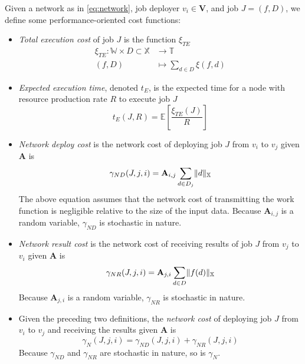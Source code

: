 \documentclass[../mthe-493-project-proposal.tex]{subfiles}
\begin{document}
    Given a network as in \eqref{eq:network}, job deployer $v_i \in \mathbf{V}$, and job $J = (f, D)$, we define some performance-oriented cost functions:
    \begin{itemize}
        \item \textit{Total execution cost} of job $J$ is the function $\xi_{TE}$
              \begin{align}
                  \xi_{TE} \colon \mathbb{W} \times D \subset \mathbb{X} &\to \mathbb{T} \label{eq:total-execution-cost} \\
                  (f, D)                                                 &\mapsto \sum\limits_{d \in D} \xi(f, d) \nonumber
              \end{align}
              
        \item \textit{Expected execution time}, denoted $t_E$, is the expected time for a node with resource production rate $R$ to execute job $J$
                \begin{equation}
                \label{eq:expected-execution-time}
                    t_E(J, R) = \mathbb{E}\left[ \frac{\xi_{TE}(J)}{R} \right]
                \end{equation}

        \item \textit{Network deploy cost} is the network cost of deploying job $J$ from $v_i$ to $v_j$ given $\mathbf{A}$ is
              \begin{equation}
              \label{eq:network-deploy-cost}
                  \gamma_{ND}(J, j, i) = \mathbf{A}_{i,j} \sum\limits_{d \in D_j} \lVert d\rVert_{\mathbb{X}}
              \end{equation}
              The above equation assumes that the network cost of transmitting the work function is negligible relative to the size of the input data. Because $\mathbf{A}_{i,j}$ is a random variable, $\gamma_{ND}$ is stochastic in nature.

        \item \textit{Network result cost} is the network cost of receiving results of job $J$ from $v_j$ to $v_i$ given $\mathbf{A}$ is
              \begin{equation}
              \label{eq:network-result-cost}
                  \gamma_{NR}(J, j, i) = \mathbf{A}_{j, i} \sum\limits_{d \in D} \lVert f(d)\rVert_{\mathbb{X}}
              \end{equation}
              Because $\mathbf{A}_{j,i}$ is a random variable, $\gamma_{NR}$ is stochastic in nature.

        \item Given the preceding two definitions, the \textit{network cost} of deploying job $J$ from $v_i$ to $v_j$ and receiving the results  given $\mathbf{A}$ is
              \begin{equation}
              \label{eq:network-cost}
                  \gamma_N(J, j, i) = \gamma_{ND}(J, j, i) + \gamma_{NR}(J, j, i)
              \end{equation}
              Because $\gamma_{ND}$ and $\gamma_{NR}$ are stochastic in nature, so is $\gamma_N$.
    \end{itemize}
\end{document}
